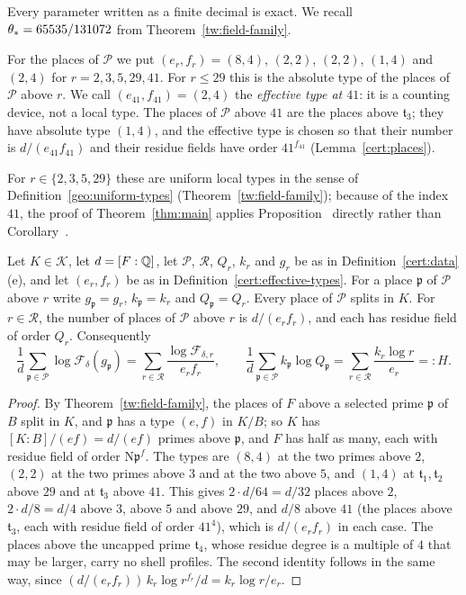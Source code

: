 Every parameter written as a finite decimal is exact. We recall
$\theta_*=65535/131072$ from Theorem~\ref{tw:field-family}.

\begin{definition}\label{cert:effective-types}
For the places of $\mathcal P$ we put $(e_r,f_r)=(8,4)$, $(2,2)$, $(2,2)$,
$(1,4)$ and $(2,4)$ for $r=2,3,5,29,41$. For $r\le29$ this is the absolute
type of the places of $\mathcal P$ above $r$. We call $(e_{41},f_{41})=(2,4)$
the \emph{effective type at $41$}: it is a counting device, not a local type.
The places of $\mathcal P$ above $41$ are the places above $\mathfrak t_3$;
they have absolute type $(1,4)$, and the effective type is chosen so that
their number is $d/(e_{41}f_{41})$ and their residue fields have order
$41^{f_{41}}$ (Lemma~\ref{cert:places}).
\end{definition}

For $r\in\{2,3,5,29\}$ these are uniform local types in the sense of
Definition~\ref{geo:uniform-types} (Theorem~\ref{tw:field-family}); because of
the index $41$, the proof of Theorem~\ref{thm:main} applies
Proposition~ directly rather than
Corollary~.

\begin{lemma}\label{cert:places}
Let $K\in\mathcal K$, let $d=[F:\mathbb Q]$, let $\mathcal P$, $\mathcal R$, $Q_r$,
$k_r$ and $g_r$ be as in Definition~\ref{cert:data}(e), and let $(e_r,f_r)$ be
as in Definition~\ref{cert:effective-types}. For a place $\mathfrak p$ of
$\mathcal P$ above $r$ write $g_{\mathfrak p}=g_r$, $k_{\mathfrak p}=k_r$ and
$Q_{\mathfrak p}=Q_r$. Every place of $\mathcal P$ splits
in $K$. For $r\in\mathcal R$, the number of places of $\mathcal P$ above $r$
is $d/(e_rf_r)$, and each has residue field of order $Q_r$. Consequently
\[
 \frac1d\sum_{\mathfrak p\in\mathcal P}\log\mathcal F_\delta(g_{\mathfrak p})
 =\sum_{r\in\mathcal R}\frac{\log\mathcal F_{\delta,r}}{e_rf_r},\qquad
 \frac1d\sum_{\mathfrak p\in\mathcal P}k_{\mathfrak p}\log Q_{\mathfrak p}
 =\sum_{r\in\mathcal R}\frac{k_r\log r}{e_r}=:H.
\]
\end{lemma}

\begin{proof}
By Theorem~\ref{tw:field-family}, the places of $F$ above a selected prime
$\mathfrak p$ of $B$ split in $K$, and $\mathfrak p$ has a type $(e,f)$ in
$K/B$; so $K$ has $[K:B]/(ef)=d/(ef)$ primes above $\mathfrak p$, and $F$ has
half as many, each with residue field of order $\mathrm N\mathfrak p^f$. The
types are $(8,4)$ at the two primes above $2$, $(2,2)$ at the two primes above
$3$ and at the two above $5$, and $(1,4)$ at $\mathfrak t_1,\mathfrak t_2$
above $29$ and at $\mathfrak t_3$ above $41$. This gives $2\cdot d/64=d/32$
places above $2$, $2\cdot d/8=d/4$ above $3$, above $5$ and above $29$, and
$d/8$ above $41$ (the places above $\mathfrak t_3$, each with residue field
of order $41^4$), which is $d/(e_rf_r)$ in each case. The places above the
uncapped prime $\mathfrak t_4$, whose residue degree is a multiple of $4$
that may be larger, carry no shell profiles. The
second identity follows in the same way, since
$(d/(e_rf_r))\,k_r\log r^{f_r}/d=k_r\log r/e_r$.
\end{proof}

